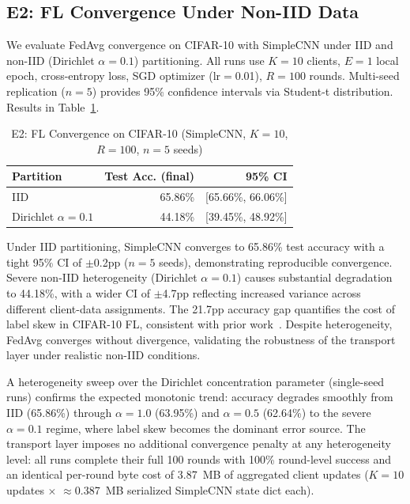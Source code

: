 ﻿\documentclass[journal]{IEEEtran}
\begin{document}
\subsection{E2: FL Convergence Under Non-IID Data}
\label{sec:e2}

We evaluate FedAvg convergence on CIFAR-10 with SimpleCNN under IID and non-IID (Dirichlet $\alpha{=}0.1$) partitioning. All runs use $K{=}10$ clients, $E{=}1$ local epoch, cross-entropy loss, SGD optimizer (lr$=$0.01), $R{=}100$ rounds. Multi-seed replication ($n{=}5$) provides 95\% confidence intervals via Student-t distribution. Results in Table~\ref{tab:e2}.

\begin{table}[t]
\centering
\caption{E2: FL Convergence on CIFAR-10 (SimpleCNN, $K{=}10$, $R{=}100$, $n{=}5$ seeds)}
\label{tab:e2}
\footnotesize
\begin{tabular}{l r r}
\toprule
\textbf{Partition} & \textbf{Test Acc. (final)} & \textbf{95\% CI} \\
\midrule
IID                  & 65.86\% & [65.66\%, 66.06\%] \\
Dirichlet $\alpha{=}0.1$ & 44.18\% & [39.45\%, 48.92\%] \\
\bottomrule
\end{tabular}
\end{table}

Under IID partitioning, SimpleCNN converges to 65.86\% test accuracy with a tight 95\% CI of $\pm$0.2pp ($n{=}5$ seeds), demonstrating reproducible convergence. Severe non-IID heterogeneity (Dirichlet $\alpha{=}0.1$) causes substantial degradation to 44.18\%, with a wider CI of $\pm$4.7pp reflecting increased variance across different client-data assignments. The 21.7pp accuracy gap quantifies the cost of label skew in CIFAR-10 FL, consistent with prior work~\cite{li2020federated,scaffold2020}. Despite heterogeneity, FedAvg converges without divergence, validating the robustness of the transport layer under realistic non-IID conditions.

A heterogeneity sweep over the Dirichlet concentration parameter (single-seed runs) confirms the expected monotonic trend: accuracy degrades smoothly from IID (65.86\%) through $\alpha{=}1.0$ (63.95\%) and $\alpha{=}0.5$ (62.64\%) to the severe $\alpha{=}0.1$ regime, where label skew becomes the dominant error source. The transport layer imposes no additional convergence penalty at any heterogeneity level: all runs complete their full 100 rounds with 100\% round-level success and an identical per-round byte cost of 3.87~MB of aggregated client updates ($K{=}10$ updates $\times$ $\approx$0.387~MB serialized SimpleCNN state dict each).
\end{document}
